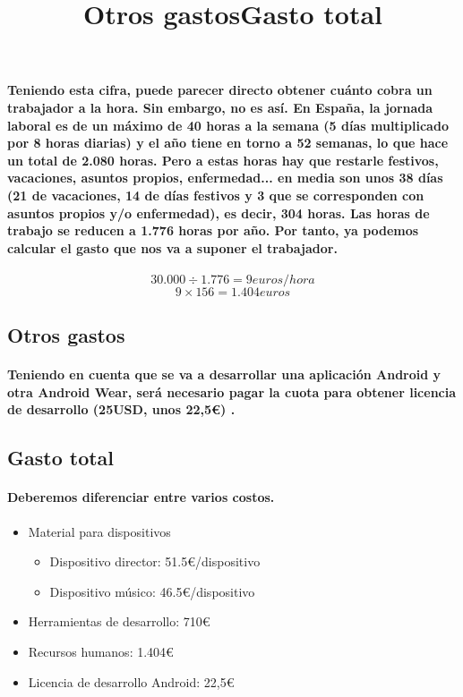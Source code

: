\paragraph{
Teniendo esta cifra, puede parecer directo obtener cuánto cobra un trabajador a la hora. Sin
embargo, no es así. En España, la jornada laboral es de un máximo de 40 horas a la semana (5 días
multiplicado por 8 horas diarias) y el año tiene en torno a 52 semanas, lo que hace un total de 2.080 horas.
Pero a estas horas hay que restarle festivos, vacaciones, asuntos propios, enfermedad... en media
son unos 38 días (21 de vacaciones, 14 de días festivos y 3 que se corresponden con asuntos propios y/o
enfermedad), es decir, 304 horas. Las horas de trabajo se reducen a 1.776 horas por año. Por tanto, ya
podemos calcular el gasto que nos va a suponer el trabajador.
}

\[
  30.000 \div 1.776 = 9 euros/hora
\]
\[
  9 \times 156 = 1.404 euros
\]

\subsection{Otros gastos}
\title{Otros gastos}
\paragraph{
Teniendo en cuenta que se va a desarrollar una aplicación Android y otra Android Wear,
será necesario pagar la cuota para obtener licencia de desarrollo (25USD, unos 22,5\euro) \cite{desarrollaAndroid}.
}

\subsection{Gasto total}
\title{Gasto total}
\paragraph{Deberemos diferenciar entre varios costos.}

  \begin{itemize}
    \item Material para dispositivos
      \begin{itemize}
        \item Dispositivo director: 51.5\euro/dispositivo
        \item Dispositivo músico: 46.5\euro/dispositivo
      \end{itemize}
    \item Herramientas de desarrollo: 710\euro
    \item Recursos humanos: 1.404\euro
    \item Licencia de desarrollo Android: 22,5\euro
  \end{itemize}

